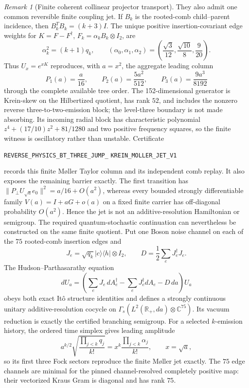 \documentclass[11pt]{article}
\theoremstyle{definition}
\theoremstyle{remark}
\newtheorem{remark}[theorem]{Remark}
\begin{document}
\begin{remark}[Finite coherent collinear projector transport]
They also admit one common reversible finite coupling jet.  If $B_k$ is the
rooted-comb child--parent incidence, then $B_k^TB_k=(k+3)I$.  The unique
positive insertion-covariant edge weights for
$K=F-F^\dagger$, $F_k=\alpha_kB_k\otimes I_2$, are
\[
 \alpha_k^2=(k+1)q_k,
 \qquad
 (\alpha_0,\alpha_1,\alpha_2)
 =\left(\frac{\sqrt3}{12},\frac{\sqrt{10}}8,\frac9{20}\right).
\]
Thus $U_x=e^{xK}$ reproduces, with $a=x^2$, the aggregate leading column
\[
 P_1(a)=\frac a{16},\qquad
 P_2(a)=\frac{5a^2}{512},\qquad
 P_3(a)=\frac{9a^3}{8192}
\]
through the complete available tree order.  The 152-dimensional generator is
Krein-skew on the Hilbertized quotient, has rank $52$, and includes the
nonzero reverse three-to-two-emission block; the level-three boundary is not
made absorbing.  Its incoming radial block has characteristic polynomial
$z^4+(17/10)z^2+81/1280$ and two positive frequency squares, so the finite
witness is oscillatory rather than unstable.  Certificate
\par\noindent
\texttt{REVERSE\_PHYSICS\_BT\_THREE\_JUMP\_}
\allowbreak\texttt{KREIN\_MOLLER\_JET\_V1}
\par\noindent
records this finite M\o ller Taylor column and its independent comb replay.
It also exposes the remaining barrier exactly.  The first transition has
$\|P_\perp U_{\sqrt a}e_0\|^2=a/16+O(a^2)$, whereas every bounded strongly
differentiable family $V(a)=I+aG+o(a)$ on a fixed finite carrier has
off-diagonal probability $O(a^2)$.  Hence the jet is not an
additive-resolution Hamiltonian or semigroup.  The required
quantum-stochastic continuation can nevertheless be constructed on the same
finite quotient.  Put one Boson noise channel on each of the $75$ rooted-comb
insertion edges and
\[
 J_e=\sqrt{q_k}|c\rangle\langle h|\otimes I_2,
 \qquad
 D=\frac12\sum_eJ_e^\dagger J_e .
\]
The Hudson--Parthasarathy equation \cite{HudsonParthasarathy1984}
\[
 dU_a=\left(\sum_eJ_e\,dA_e^\dagger
 -\sum_eJ_e^\dagger dA_e-D\,da\right)U_a
\]
obeys both exact It\^o structure identities and defines a strongly continuous
unitary additive-resolution cocycle on
$\Gamma_s(L^2(\mathbb R_+,da)\otimes\mathbb C^{75})$.  Its vacuum reduction
is exactly the certified branching semigroup.  For a selected $k$-emission
history, the ordered time simplex gives leading amplitude
\[
 a^{k/2}\sqrt{\frac{\prod_{j<k}q_j}{k!}}
 =x^k\frac{\prod_{j<k}\alpha_j}{k!},\qquad x=\sqrt a,
\]
so its first three Fock sectors reproduce the finite M\o ller jet exactly.
The $75$ edge channels are minimal for the pinned channel-resolved completely
positive map: their vectorized Kraus Gram is diagonal and has rank $75$.

\end{remark}
\end{document}
